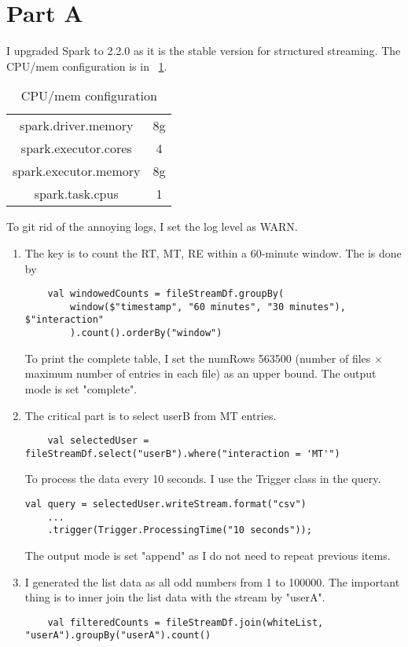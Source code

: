 \section{Part A}

I upgraded Spark to 2.2.0 as it is the stable version for structured streaming. The CPU/mem configuration is in \tablename{~\ref{a2:pa:cfg}}.
\begin{table}[h]
	\centering
	\begin{tabular}{|c|c|}
		\hline
		spark.driver.memory  &            8g \\
		spark.executor.cores  &           4 \\
		spark.executor.memory  &          8g \\
		spark.task.cpus         &         1 \\
		\hline
	\end{tabular}
	\caption{CPU/mem configuration}
	\label{a2:pa:cfg}
\end{table}
To git rid of the annoying logs, I set the log level as WARN.

\begin{enumerate}[label=Question \arabic*.]
\item The key is to count the RT, MT, RE within a 60-minute window. The is done by
\begin{verbatim}
    val windowedCounts = fileStreamDf.groupBy(
	    window($"timestamp", "60 minutes", "30 minutes"), $"interaction"
	    ).count().orderBy("window")
\end{verbatim}

To print the complete table, I set the numRows 563500 (number of files $\times$ maximum number of entries in each file) as an upper bound. The output mode is set "complete".

\item The critical part is to select userB from MT entries. 
\begin{verbatim}
	val selectedUser = fileStreamDf.select("userB").where("interaction = 'MT'")
\end{verbatim}
To process the data every 10 seconds. I use the Trigger class in the query.
\begin{verbatim}
val query = selectedUser.writeStream.format("csv")
	...
	.trigger(Trigger.ProcessingTime("10 seconds"));
\end{verbatim}
The output mode is set "append" as I do not need to repeat previous items.
\item I generated the list data as all odd numbers from 1 to 100000. The important thing is to inner join the list data with the stream by "userA".
\begin{verbatim}
	val filteredCounts = fileStreamDf.join(whiteList, "userA").groupBy("userA").count()
\end{verbatim}
    
\end{enumerate}